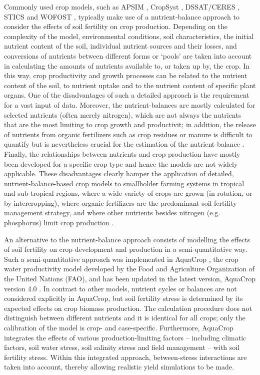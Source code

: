 Commonly used crop models, such as APSIM \parencite{keating2003}, CropSyst \parencite{stockle2003}, DSSAT/CERES \parencite{jones2003}, STICS \parencite{brisson2003} and WOFOST \parencite{boogaard2014}, typically make use of a nutrient-balance approach to consider the effects of soil fertility on crop production. Depending on the complexity of the model, environmental conditions, soil characteristics, the initial nutrient content of the soil, individual nutrient sources and their losses, and conversions of nutrients between different forms or `pools' are taken into account in calculating the amounts of nutrients available to, or taken up by, the crop. In this way, crop productivity and growth processes can be related to the nutrient content of the soil, to nutrient uptake and to the nutrient content of specific plant organs. One of the disadvantages of such a detailed approach is the requirement for a vast input of data. Moreover, the nutrient-balances are mostly calculated for selected nutrients (often merely nitrogen), which are not always the nutrients that are the most limiting to crop growth and productivit\parencite{probert2000,probert2004,brisson2003}; in addition, the release of nutrients from organic fertilizers such as crop residues or manure is difficult to quantify but is nevertheless crucial for the estimation of the nutrient-balance \parencite{probert2004a,gijsman2002}. Finally, the relationships between nutrients and crop production have mostly been developed for a specific crop type and hence the models are not widely applicable. These disadvantages clearly hamper the application of detailed, nutrient-balance-based crop models to smallholder farming systems in tropical and sub-tropical regions, where a wide variety of crops are grown (in rotation, or by intercropping), where organic fertilizers are the predominant soil fertility management strategy, and where other nutrients besides nitrogen (e.g. phosphorus) limit crop production \parencite{delve2009,whitbread2010}. 

An alternative to the nutrient-balance approach consists of modelling the effects of soil fertility on crop development and production in a semi-quantitative way. Such a semi-quantitative approach was implemented in AquaCrop \parencite{hsiao2009,steduto2009,raes2009}, the crop water productivity model developed by the Food and Agriculture Organization of the United Nations (FAO), and has been updated in the latest version, AquaCrop version 4.0 \parencite{raes2012}. In contrast to other models, nutrient cycles or balances are not considered explicitly in AquaCrop, but soil fertility stress is determined by its expected effects on crop biomass production. The calculation procedure does not distinguish between different nutrients and it is identical for all crops; only the calibration of the model is crop- and case-specific. Furthermore, AquaCrop integrates the effects of various production-limiting factors – including climatic factors, soil water stress, soil salinity stress and field management – with soil fertility stress. Within this integrated approach, between-stress interactions are taken into account, thereby allowing realistic yield simulations to be made.

